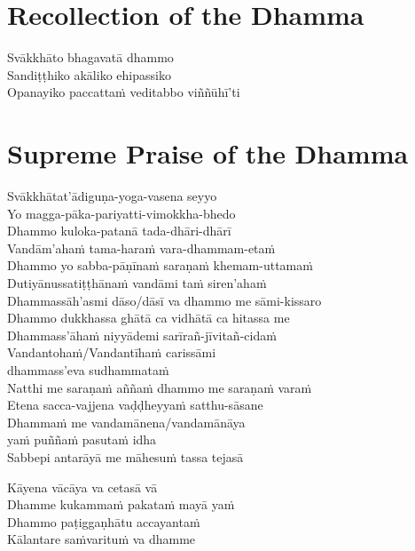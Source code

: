 \section*{Recollection of the Dhamma}

\begin{leader}
\end{leader}

Svākkhāto bhagavatā dhammo\\
Sandiṭṭhiko akāliko ehipassiko\\
Opanayiko paccattaṁ veditabbo viññūhī'ti

\section*{Supreme Praise of the Dhamma}

\begin{leader}
\end{leader}

Svākkhātat'ādiguṇa-yoga-vasena seyyo\\
Yo magga-pāka-pariyatti-vimokkha-bhedo\\
Dhammo kuloka-patanā tada-dhāri-dhārī\\
Vandām'ahaṁ tama-haraṁ vara-dhammam-etaṁ\\
Dhammo yo sabba-pāṇīnaṁ saraṇaṁ khemam-uttamaṁ\\
Dutiyānussatiṭṭhānaṁ vandāmi taṁ siren'ahaṁ\\
Dhammassāh'asmi dāso/dāsī va dhammo me sāmi-kissaro\\
Dhammo dukkhassa ghātā ca vidhātā ca hitassa me\\
Dhammass'āhaṁ niyyādemi sarīrañ-jīvitañ-cidaṁ\\
Vandantohaṁ/Vandantīhaṁ carissāmi\\
\vin dhammass'eva sudhammataṁ\\
Natthi me saraṇaṁ aññaṁ dhammo me saraṇaṁ varaṁ\\
Etena sacca-vajjena vaḍḍheyyaṁ satthu-sāsane\\
Dhammaṁ me vandamānena/vandamānāya\\
\vin yaṁ puññaṁ pasutaṁ idha\\
Sabbepi antarāyā me māhesuṁ tassa tejasā

\enlargethispage{\baselineskip}


Kāyena vācāya va cetasā vā\\
Dhamme kukammaṁ pakataṁ mayā yaṁ\\
Dhammo paṭiggaṇhātu accayantaṁ\\
Kālantare saṁvarituṁ va dhamme

